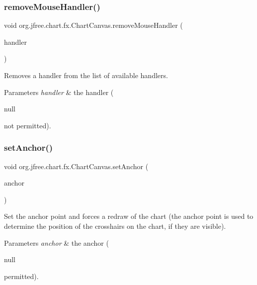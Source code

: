 \subsubsection{\texorpdfstring{remove\+Mouse\+Handler()}{removeMouseHandler()}}
{\footnotesize\ttfamily void org.\+jfree.\+chart.\+fx.\+Chart\+Canvas.\+remove\+Mouse\+Handler (\begin{DoxyParamCaption}\item[{\mbox{\hyperlink{interfaceorg_1_1jfree_1_1chart_1_1fx_1_1interaction_1_1_mouse_handler_f_x}{Mouse\+Handler\+FX}}}]{handler }\end{DoxyParamCaption})}

Removes a handler from the list of available handlers.


\begin{DoxyParams}{Parameters}
{\em handler} & the handler (
\begin{DoxyCode}
null 
\end{DoxyCode}
 not permitted). \\
\hline
\end{DoxyParams}
\mbox{\label{classorg_1_1jfree_1_1chart_1_1fx_1_1_chart_canvas_a670e346dcc9c53b3e4eced8d091769c5}} 
\subsubsection{\texorpdfstring{set\+Anchor()}{setAnchor()}}
{\footnotesize\ttfamily void org.\+jfree.\+chart.\+fx.\+Chart\+Canvas.\+set\+Anchor (\begin{DoxyParamCaption}\item[{Point2D}]{anchor }\end{DoxyParamCaption})}

Set the anchor point and forces a redraw of the chart (the anchor point is used to determine the position of the crosshairs on the chart, if they are visible).


\begin{DoxyParams}{Parameters}
{\em anchor} & the anchor (
\begin{DoxyCode}
null 
\end{DoxyCode}
 permitted). \\
\hline
\end{DoxyParams}
\mbox{\label{classorg_1_1jfree_1_1chart_1_1fx_1_1_chart_canvas_a7afcaa5e64560f44d596df90233afaaf}} 
